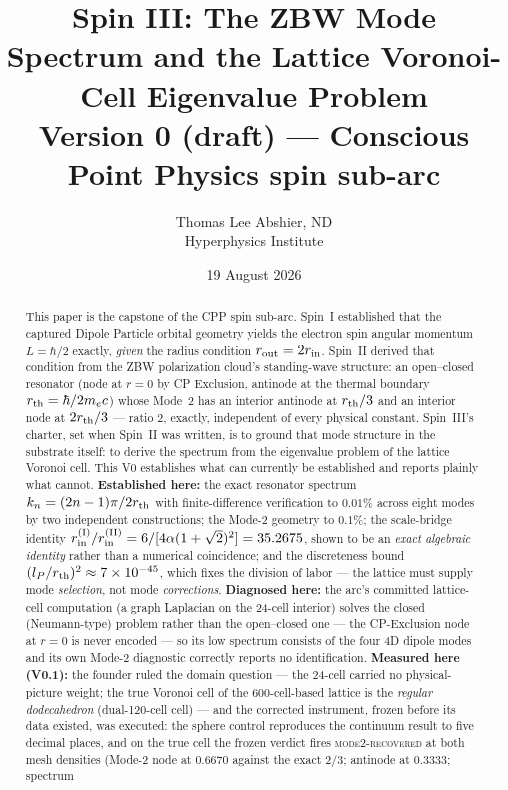 \documentclass[12pt]{article}
\title{Spin III: The ZBW Mode Spectrum and the Lattice
Voronoi-Cell Eigenvalue Problem\\
\normalsize Version 0 (draft) --- Conscious Point Physics spin sub-arc}
\author{Thomas Lee Abshier, ND\\ Hyperphysics Institute}
\date{19 August 2026}
\newcommand{\lP}{l_P}
\newcommand{\rth}{r_{\rm th}}
\newcommand{\rin}{r_{\rm in}}
\newcommand{\rout}{r_{\rm out}}
\begin{document}
\maketitle

\begin{abstract}
This paper is the capstone of the CPP spin sub-arc.  Spin~I established
that the captured Dipole Particle orbital geometry yields the electron
spin angular momentum $L = \hbar/2$ exactly, \emph{given} the radius
condition $\rout = 2\rin$.  Spin~II derived that condition from the ZBW
polarization cloud's standing-wave structure: an open--closed resonator
(node at $r=0$ by CP Exclusion, antinode at the thermal boundary
$\rth = \hbar/2m_ec$) whose Mode~2 has an interior antinode at $\rth/3$
and an interior node at $2\rth/3$ --- ratio $2$, exactly, independent of
every physical constant.  Spin~III's charter, set when Spin~II was
written, is to ground that mode structure in the substrate itself: to
derive the spectrum from the eigenvalue problem of the lattice
Voronoi cell.  This V0 establishes what can currently be established
and reports plainly what cannot.  \textbf{Established here:} the exact
resonator spectrum $k_n = (2n-1)\pi/2\rth$ with finite-difference
verification to $0.01\%$ across eight modes by two independent
constructions; the Mode-2 geometry to $0.1\%$; the scale-bridge
identity $\rin^{\rm (I)}/\rin^{\rm (II)} = 6/[4\alpha(1+\sqrt{2})^2]
= 35.2675$, shown to be an \emph{exact algebraic identity} rather than
a numerical coincidence; and the discreteness bound
$(\lP/\rth)^2 \approx 7\times10^{-45}$, which fixes the division of
labor --- the lattice must supply mode \emph{selection}, not mode
\emph{corrections}.  \textbf{Diagnosed here:} the arc's committed
lattice-cell computation (a graph Laplacian on the 24-cell interior)
solves the closed (Neumann-type) problem rather than the open--closed
one --- the CP-Exclusion node at $r=0$ is never encoded --- so its low
spectrum consists of the four 4D dipole modes and its own Mode-2
diagnostic correctly reports no identification.  \textbf{Measured here
(V0.1):} the founder ruled the domain question --- the 24-cell carried
no physical-picture weight; the true Voronoi cell of the 600-cell-based
lattice is the \emph{regular dodecahedron} (dual-120-cell cell) --- and
the corrected instrument, frozen before its data existed, was executed:
the sphere control reproduces the continuum result to five decimal
places, and on the true cell the frozen verdict fires
\textsc{mode2-recovered} at both mesh densities (Mode-2 node at
$0.6670$ against the exact $2/3$; antinode at $0.3333$; spectrum

\end{abstract}
\end{document}
